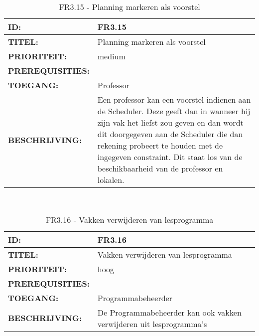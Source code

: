 \noindent\begin{table}[H]
            \begin{tabular}{l | p{10cm}}
                \textbf{ID:} & FR3.15 \\ \hline
                \textbf{TITEL:} & Planning markeren als voorstel\\ \hline
                \textbf{PRIORITEIT:} &  medium \\ \hline
                \textbf{PREREQUISITIES:} & \\ \hline
                \textbf{TOEGANG:} & Professor \\ \hline
                \textbf{BESCHRIJVING:} & Een professor kan een voorstel indienen aan de Scheduler. 
                                        Deze geeft dan in wanneer hij zijn vak het liefst zou geven en dan wordt dit doorgegeven aan de Scheduler die dan rekening probeert te houden met de ingegeven constraint. Dit staat los van de beschikbaarheid van de professor en lokalen.  \\
            \end{tabular}\\
            \caption{FR3.15 - Planning markeren als voorstel}
            \label{tab:FR3.15 - Planning markeren als voorstel}
        \end{table}

\noindent\begin{table}[H]
            \begin{tabular}{l | p{10cm}}
                \textbf{ID:} & FR3.16 \\ \hline
                \textbf{TITEL:} & Vakken verwijderen van lesprogramma\\ \hline
                \textbf{PRIORITEIT:} &  hoog \\ \hline
                \textbf{PREREQUISITIES:} & \\ \hline
                \textbf{TOEGANG:} & Programmabeheerder \\ \hline
                \textbf{BESCHRIJVING:} & De Programmabeheerder kan ook vakken verwijderen uit lesprogramma’s \\ 
            \end{tabular}\\
            \caption{FR3.16 - Vakken verwijderen van lesprogramma}
            \label{tab:FR3.16 - Vakken verwijderen van lesprogramma}
        \end{table}

